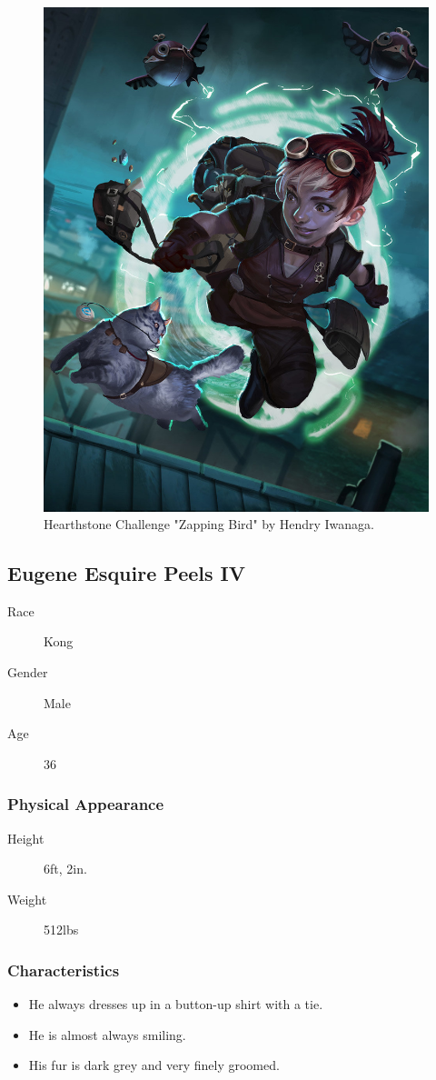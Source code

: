\begin{figure}[h!]
    \centering
    \includegraphics[width=0.5\linewidth]{images/characters-gnome.jpg}
    \caption{Hearthstone Challenge "Zapping Bird" by Hendry Iwanaga.\nocite{iwanaga_hearthstone_2015}}
\end{figure}

\pagebreak

\subsection{Eugene Esquire Peels IV}

\begin{description}
    \item[Race] Kong
    \item[Gender] Male
    \item[Age] 36  
\end{description}

\subsubsection{Physical Appearance}

\begin{description}
    \item[Height] 6ft, 2in.
    \item[Weight] 512lbs
\end{description}

\subsubsection{Characteristics}

\begin{itemize}
    \item He always dresses up in a button-up shirt with a tie.
    \item He is almost always smiling.
    \item His fur is dark grey and very finely groomed.
\end{itemize}

